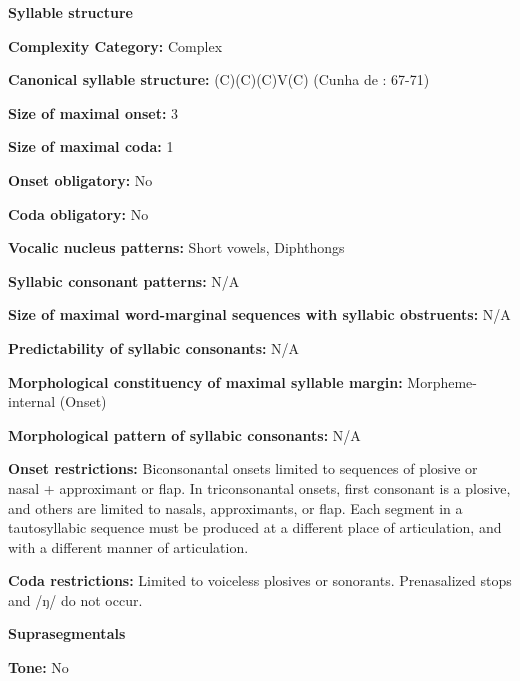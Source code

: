 \textbf{Syllable structure}



\textbf{Complexity Category:} Complex



\textbf{Canonical syllable structure:} (C)(C)(C)V(C) (Cunha de \citealt{Oliveira2005}: 67-71)



\textbf{Size of maximal onset:} 3



\textbf{Size of maximal coda:} 1



\textbf{Onset obligatory:} No



\textbf{Coda obligatory:} No



\textbf{Vocalic nucleus patterns:} Short vowels, Diphthongs



\textbf{Syllabic consonant patterns:} N/A



\textbf{Size of maximal word{}-marginal sequences with syllabic obstruents:} N/A



\textbf{Predictability of syllabic consonants:} N/A 



\textbf{Morphological constituency of maximal syllable margin:} Morpheme-internal (Onset)



\textbf{Morphological pattern of syllabic consonants:} N/A



\textbf{Onset restrictions:} Biconsonantal onsets limited to sequences of plosive or nasal + approximant or flap. In triconsonantal onsets, first consonant is a plosive, and others are limited to nasals, approximants, or flap. Each segment in a tautosyllabic sequence must be produced at a different place of articulation, and with a different manner of articulation.



\textbf{Coda restrictions:} Limited to voiceless plosives or sonorants. Prenasalized stops and /ŋ/ do not occur.



\textbf{Suprasegmentals}



\textbf{Tone:} No



